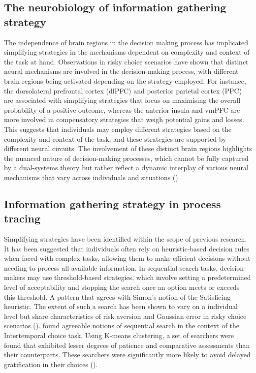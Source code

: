 \documentclass[man, floatsintext]{apa7}
\begin{document}
\subsection{The neurobiology of information gathering strategy}

The independence of brain regions in the decision making process has implicated simplifying strategies in the mechanisms dependent on complexity and context of the task at hand. Observations in risky choice scenarios have shown that distinct neural mechanisms are involved in the decision-making process, with different brain regions being activated depending on the strategy employed. For instance, the dorsolateral prefrontal cortex (dlPFC) and posterior parietal cortex (PPC) are associated with simplifying strategies that focus on maximising the overall probability of a positive outcome, whereas the anterior insula and vmPFC are more involved in compensatory strategies that weigh potential gains and losses. This suggests that individuals may employ different strategies based on the complexity and context of the task, and these strategies are supported by different neural circuits. The involvement of these distinct brain regions highlights the nuanced nature of decision-making processes, which cannot be fully captured by a dual-systems theory but rather reflect a dynamic interplay of various neural mechanisms that vary across individuals and situations (\cite{venkatramanSeparateNeuralMechanisms2009})

\subsection{Information gathering strategy in process tracing}

Simplifying strategies have been identified within the scope of previous research. It has been suggested that individuals often rely on heuristic-based decision rules when faced with complex tasks, allowing them to make efficient decisions without needing to process all available information.  In sequential search tasks, decision-makers may use threshold-based strategies, which involve setting a predetermined level of acceptability and stopping the search once an option meets or exceeds this threshold. A pattern that agrees with Simon's notion of the Satisficing heuristic. The extent of such a search has been shown to vary on a individual level but share characteristics of risk aversion and Gaussian error in risky choice scenarios (\cite{bhatiaCognitiveModelsOptimal2021}). \citeauthor{reeckSearchPredictsChanges2017b} found agreeable notions of sequential search in the context of the Intertemporal choice task. Using K-means clustering, a set of searchers were found that exhibited lesser degrees of patience and comparative assessments than their counterparts. These searchers were significantly more likely to avoid delayed gratification in their choices (\cite{reeckSearchPredictsChanges2017b}).
\end{document}
